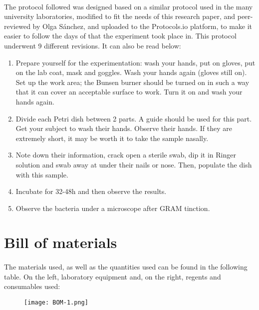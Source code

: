 \paragraph{}The protocol followed was designed based on a similar protocol used in the many university laboratories\cite{olearyPracticalHandbookMicrobiology1989}, modified to fit the needs of this research paper, and peer-reviewed by Olga Sánchez, and uploaded to the Protocols.io platform, to make it easier to follow the days of that the experiment took place in. This protocol underwent 9 different revisions\cite{rocacugatStaphilococcusAureusSampling2022a}. It can also be read below:
\begin{enumerate}[label=\arabic*)]
\item Prepare yourself for the experimentation: wash your hands, put on gloves, put on the lab coat, mask and goggles. Wash your hands again (gloves still on). Set up the work area; the Bunsen burner should be turned on in such a way that it can cover an acceptable surface to work. Turn it on and wash your hands again.
\item Divide each Petri dish between 2 parts. A guide should be used for this part. Get your subject to wash their hands. Observe their hands. If they are extremely short, it may be worth it to take the sample nasally.
\item Note down their information, crack open a sterile swab, dip it in Ringer solution and swab away at under their nails or nose. Then, populate the dish with this sample.
\item Incubate for 32-48h and then observe the results.
\item Observe the bacteria under a microscope after GRAM tinction.
\end{enumerate}
\section{Bill of materials}
\paragraph{}The materials used, as well as the quantities used can be found in the following table. On the left, laboratory equipment and, on the right, regents and consumables used:
\begin{center}\begin{figure}\texttt{[image: BOM-1.png]}\end{figure}\end{center}
